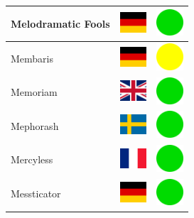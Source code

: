 \documentclass[12pt, a4paper, twoside]{report}
\begin{document}
\begin{center}
\begin{longtable}{|p{5cm}|p{2cm}|p{2cm}|}
 Melodramatic Fools                                         & \includegraphics[width=1cm]{../img/flags/de} &   \includegraphics[width=1cm]{../likes/y} \\ \hline
 Membaris                                                   & \includegraphics[width=1cm]{../img/flags/de} &   \includegraphics[width=1cm]{../likes/m} \\ \hline
 Memoriam                                                   & \includegraphics[width=1cm]{../img/flags/gb} &   \includegraphics[width=1cm]{../likes/y} \\ \hline
 Mephorash                                                  & \includegraphics[width=1cm]{../img/flags/se} &   \includegraphics[width=1cm]{../likes/y} \\ \hline
 Mercyless                                                  & \includegraphics[width=1cm]{../img/flags/fr} &   \includegraphics[width=1cm]{../likes/y} \\ \hline
 Messticator                                                & \includegraphics[width=1cm]{../img/flags/de} &   \includegraphics[width=1cm]{../likes/y} \\ \hline

\end{longtable}
\end{center}
\end{document}
